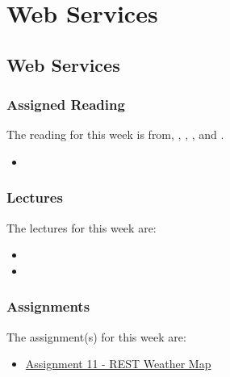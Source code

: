 \clearpage

\renewcommand{\ChapTitle}{Web Services}
\renewcommand{\SectionTitle}{Web Services}

\chapter{\ChapTitle}

\section{\SectionTitle}

\subsection{Assigned Reading}

The reading for this week is from, \AgileBook, \EngSoftBook, \ProGitBook, and \LinuxBook.

\begin{itemize}
    \item {}
\end{itemize}

\subsection{Lectures}

The lectures for this week are:

\begin{itemize}
    \item {}
    \item {}
\end{itemize}

\subsection{Assignments}

The assignment(s) for this week are:

\begin{itemize}
    \item \href{https://github.com/QuantumCompiler/CU/tree/main/CSPB%203308%20-%20Software%20Development%20Methods%20And%20Tools/Assignments/Assignment%2011%20-%20REST%20Weather%20App}{Assignment 11 - REST Weather Map}
\end{itemize}

